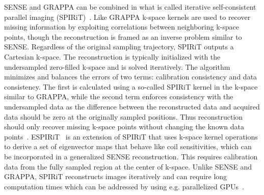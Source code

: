 SENSE and GRAPPA can be combined in what is called iterative self-consistent parallel imaging (SPIRiT)~\cite{SPIRiT}. Like GRAPPA k-space kernels are used to recover missing information by exploiting correlations between neighboring k-space points, though the reconstruction is framed as an inverse problem similar to SENSE. Regardless of the original sampling trajectory, SPIRiT outputs a Cartesian k-space. The reconstruction is typically initialized with the undersampled zero-filled k-space and is solved iteratively. 
The algorithm 
minimizes and balances the errors of two terms: calibration consistency and data consistency. The first is calculated using a so-called SPIRiT kernel in the k-space similar to GRAPPA, while the second term enforces consistency with the undersampled data as the difference between the reconstructed data and acquired data should be zero at the originally sampled positions. Thus reconstruction should only recover missing k-space points without changing the known data points~\cite{AdvancesPI}.%
ESPIRiT~\cite{ESPIRiT} is an extension of SPIRiT that uses k-space kernel operations to derive a set of eigenvector maps that behave like coil sensitivities, which can be incorporated in a generalized SENSE reconstruction. This requires calibration data from the fully sampled region at the center of k-space. 
Unlike SENSE and GRAPPA, SPIRiT reconstructs images iteratively and can require long computation times which can be addressed by using e.g. parallelized GPUs~\cite{AdvancesPI}.

